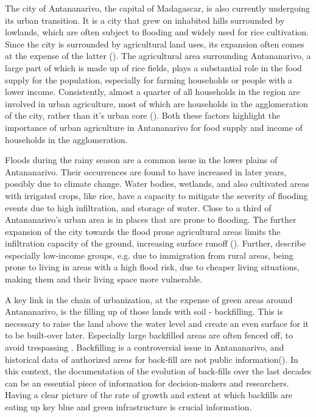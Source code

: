\documentclass[11pt, A4, oneside]{report}
\begin{document}
The city of Antananarivo, the capital of Madagascar, is also currently undergoing its urban transition. It is a city that grew on inhabited hills surrounded by lowlands, which are often subject to flooding and widely used for rice cultivation. Since the city is surrounded by agricultural land uses, its expansion often comes at the expense of the latter (\cite{Aubry.2012, Dupuy.2020b}). 
The agricultural area surrounding Antananarivo, a large part of which is made up of rice fields, plays a substantial role in the food supply for the population, especially for farming households or people with a lower income. Consistently, almost a quarter of all households in the region are involved in urban agriculture, most of which are households in the agglomeration of the city, rather than it's urban core (\cite{Dupuy.2020b}). Both these factors highlight the importance of urban agriculture in Antananarivo for food supply and income of households in the agglomeration. %

Floods during the rainy season are a common issue in the lower plains of Antananarivo. Their occurrences are found to have increased in later years, possibly due to climate change.
Water bodies, wetlands, and also cultivated areas with irrigated crops, like rice, have a capacity to mitigate the severity of flooding events due to high infiltration, and storage of water.
Close to a third of Antananarivo's urban area is in places that are prone to flooding. The further expansion of the city towards the flood prone agricultural areas limits the infiltration capacity of the ground, increasing surface runoff (\cite{Ramiaramanana.2021, Li.2013}). Further, \citet{Ramiaramanana.2021} describe especially low-income groups, e.g. due to immigration from rural areas, being prone to living in areas with a high flood risk, due to cheaper living situations, making them and their living space more vulnerable. 

A key link in the chain of urbanization, at the expense of green areas around Antananarivo, is the filling up of those lands with soil - backfilling. This is necessary to raise the land above the water level and create an even surface for it to be built-over later. Especially large backfilled areas are often fenced off, to avoid trespassing . Backfilling is a controversial issue in Antananarivo, and historical data of authorized areas for back-fill are not public information(\cite{Abrieu.2011}). In this context, the documentation of the evolution of back-fills over the last decades can be an essential piece of information for decision-makers and researchers. Having a clear picture of the rate of growth and extent at which backfills are eating up key blue and green infrastructure is crucial information.
\end{document}
